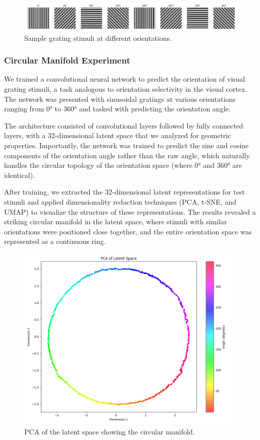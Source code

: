 \documentclass[11pt,a4paper]{article}
\begin{document}
\begin{figure}[h]
    \centering
    \includegraphics[width=0.8\linewidth]{results/grating_samples.png}
    \caption{Sample grating stimuli at different orientations.}
    \label{fig:grating_samples}
\end{figure}

\subsubsection{Circular Manifold Experiment}

We trained a convolutional neural network to predict the orientation of visual grating stimuli, a task analogous to orientation selectivity in the visual cortex. The network was presented with sinusoidal gratings at various orientations ranging from 0° to 360° and tasked with predicting the orientation angle.

The architecture consisted of convolutional layers followed by fully connected layers, with a 32-dimensional latent space that we analyzed for geometric properties. Importantly, the network was trained to predict the sine and cosine components of the orientation angle rather than the raw angle, which naturally handles the circular topology of the orientation space (where 0° and 360° are identical).

After training, we extracted the 32-dimensional latent representations for test stimuli and applied dimensionality reduction techniques (PCA, t-SNE, and UMAP) to visualize the structure of these representations. The results revealed a striking circular manifold in the latent space, where stimuli with similar orientations were positioned close together, and the entire orientation space was represented as a continuous ring.

\begin{figure}[h]
    \centering
    \includegraphics[width=0.8\linewidth]{results/pca_latent_space.png}
    \caption{PCA of the latent space showing the circular manifold.}
    \label{fig:pca_latent_space}
\end{figure}
\end{document}
